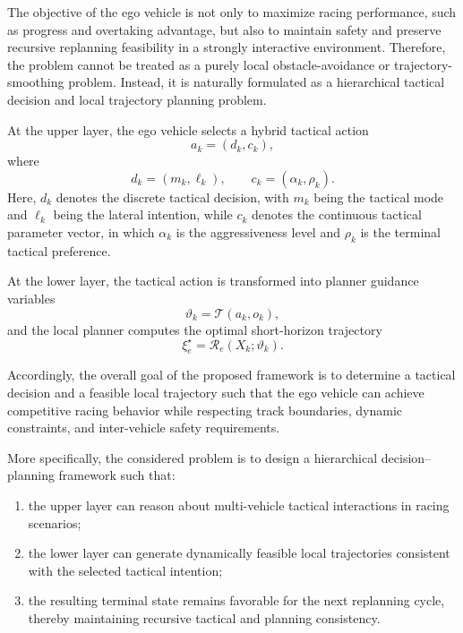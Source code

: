 \documentclass[final ,3p, times]{elsarticle}
\begin{document}
The objective of the ego vehicle is not only to maximize racing performance, such as progress and overtaking advantage, but also to maintain safety and preserve recursive replanning feasibility in a strongly interactive environment. Therefore, the problem cannot be treated as a purely local obstacle-avoidance or trajectory-smoothing problem. Instead, it is naturally formulated as a hierarchical tactical decision and local trajectory planning problem.

At the upper layer, the ego vehicle selects a hybrid tactical action
\begin{equation}
a_k=(d_k,c_k),
\label{eq:high_level_action_problem}
\end{equation}
where
\begin{equation}
d_k=(m_k,\ell_k),
\qquad
c_k=(\alpha_k,\rho_k).
\label{eq:high_level_action_components_problem}
\end{equation}
Here, $d_k$ denotes the discrete tactical decision, with $m_k$ being the tactical mode and $\ell_k$ being the lateral intention, while $c_k$ denotes the continuous tactical parameter vector, in which $\alpha_k$ is the aggressiveness level and $\rho_k$ is the terminal tactical preference.




At the lower layer, the tactical action is transformed into planner guidance variables
\begin{equation}
\vartheta_k=\mathcal{T}(a_k,o_k),
\label{eq:tactical_mapping_problem}
\end{equation}
and the local planner computes the optimal short-horizon trajectory
\begin{equation}
\xi_e^\star=\mathcal{R}_e(X_k;\vartheta_k).
\label{eq:lower_response_problem}
\end{equation}

Accordingly, the overall goal of the proposed framework is to determine a tactical decision and a feasible local trajectory such that the ego vehicle can achieve competitive racing behavior while respecting track boundaries, dynamic constraints, and inter-vehicle safety requirements.

More specifically, the considered problem is to design a hierarchical decision--planning framework such that:
\begin{enumerate}
    \item the upper layer can reason about multi-vehicle tactical interactions in racing scenarios;
    \item the lower layer can generate dynamically feasible local trajectories consistent with the selected tactical intention;
    \item the resulting terminal state remains favorable for the next replanning cycle, thereby maintaining recursive tactical and planning consistency.
\end{enumerate}
\end{document}
